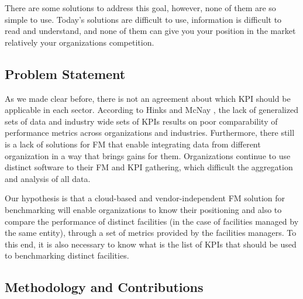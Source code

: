 There are some solutions to address this goal, however, none of them are so simple to use. Today's solutions are difficult to use, information is difficult to read and understand, and none of them can give you your position in the market relatively your organizations competition.

\subsection{Problem Statement}
As we made clear before, there is not an agreement about which KPI should be applicable in each sector. According to Hinks and McNay \cite{Hinks1999}, the lack of generalized sets of data and industry wide sets of KPIs results on poor comparability of performance metrics across organizations and industries. Furthermore, there still is a lack of solutions for FM that enable integrating data from different organization in a way that brings gains for them. 
Organizations continue to use distinct software to their FM and KPI gathering, which difficult the aggregation and analysis of all data. 

Our hypothesis is that a cloud-based and vendor-independent FM solution for benchmarking will enable organizations to know their positioning and also to compare the performance of distinct facilities (in the case of facilities managed by the same entity), through a set of metrics provided by the facilities managers. To this end, it is also necessary to know what is the list of KPIs that should be used to benchmarking distinct facilities.


\subsection{Methodology and Contributions}

